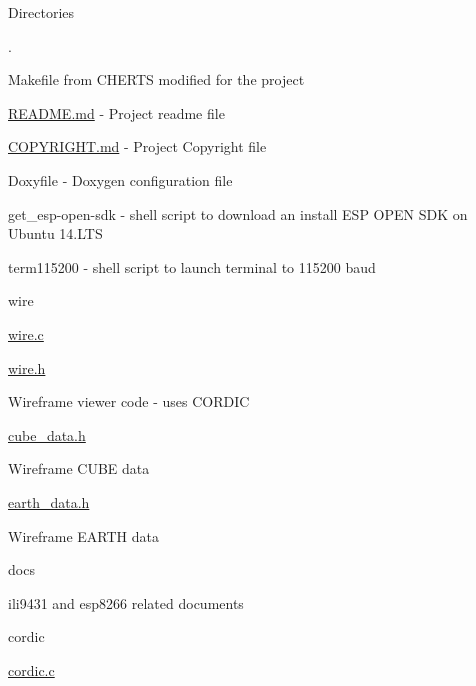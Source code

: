 \begin{DoxyParagraph}{Directories}

\begin{DoxyItemize}
\item .
\begin{DoxyItemize}
\item Makefile from C\-H\-E\-R\-T\-S modified for the project
\item \hyperlink{README_8md}{R\-E\-A\-D\-M\-E.\-md} -\/ Project readme file
\item \hyperlink{COPYRIGHT_8md}{C\-O\-P\-Y\-R\-I\-G\-H\-T.\-md} -\/ Project Copyright file
\item Doxyfile -\/ Doxygen configuration file
\item get\-\_\-esp-\/open-\/sdk -\/ shell script to download an install E\-S\-P O\-P\-E\-N S\-D\-K on Ubuntu 14.\-L\-T\-S
\item term115200 -\/ shell script to launch terminal to 115200 baud
\end{DoxyItemize}
\item wire
\begin{DoxyItemize}
\item \hyperlink{wire_8c}{wire.\-c}
\item \hyperlink{wire_8h}{wire.\-h}
\begin{DoxyItemize}
\item Wireframe viewer code -\/ uses C\-O\-R\-D\-I\-C
\end{DoxyItemize}
\item \hyperlink{cube__data_8h}{cube\-\_\-data.\-h}
\begin{DoxyItemize}
\item Wireframe C\-U\-B\-E data
\end{DoxyItemize}
\item \hyperlink{earth__data_8h}{earth\-\_\-data.\-h}
\begin{DoxyItemize}
\item Wireframe E\-A\-R\-T\-H data
\end{DoxyItemize}
\end{DoxyItemize}
\item docs
\begin{DoxyItemize}
\item ili9431 and esp8266 related documents
\end{DoxyItemize}
\item cordic
\begin{DoxyItemize}
\item \hyperlink{cordic_8c}{cordic.\-c}
\begin{DoxyItemize}

\end{DoxyItemize}
\end{DoxyItemize}
\end{DoxyItemize}
\end{DoxyParagraph}
